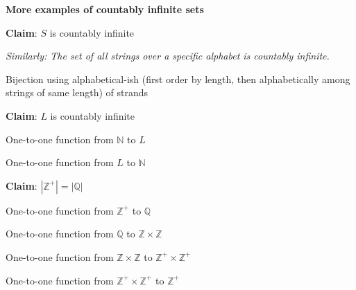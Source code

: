 
{\bf More examples of countably infinite sets}

{\bf Claim}: $S$ is countably infinite

{\it Similarly: The set of all strings over a specific alphabet is countably infinite.}
\begin{center}
Bijection using alphabetical-ish (first order by length, then alphabetically among strings of same length) of strands
\end{center}

\vspace{100pt}


{\bf Claim}: $L$ is countably infinite
\begin{center}
\begin{multicols}{2}
One-to-one function from $\mathbb{N}$ to $L$ 

One-to-one function from $L$ to $\mathbb{N}$
\end{multicols}
\end{center}


\vspace{100pt}

{\bf Claim}: $|\mathbb{Z}^+| = |\mathbb{Q}|$ 

One-to-one function from $\mathbb{Z}^+$ to $\mathbb{Q}$


\vspace{100pt}

\begin{center}
\begin{multicols}{3}
One-to-one function from $\mathbb{Q}$ to $\mathbb{Z} \times \mathbb{Z}$

One-to-one function from $\mathbb{Z} \times \mathbb{Z}$ to $\mathbb{Z}^+ \times \mathbb{Z}^+$

One-to-one function from $\mathbb{Z}^+ \times \mathbb{Z}^+$ to $\mathbb{Z}^+$
\end{multicols}
\end{center}


\vspace{100pt}